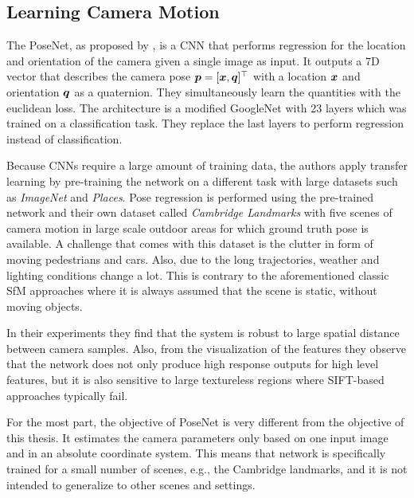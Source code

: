 		\subsection{Learning Camera Motion}
	
			The PoseNet, as proposed by \cite{kendall2015posenet}, is a CNN that performs regression for the location and orientation of the camera given a single image as input.
			It outputs a 7D vector that describes the camera pose $\bm{p} = [\bm{x}, \bm{q}]^\top$ with a location $\bm{x}$ and orientation $\bm{q}$ as a quaternion.
			They simultaneously learn the quantities with the euclidean loss.
			The architecture is a modified GoogleNet with 23 layers which was trained on a classification task.
			They replace the last layers to perform regression instead of classification.
			
			Because CNNs require a large amount of training data, the authors apply transfer learning by pre-training the network on a different task with large datasets such as \emph{ImageNet} and \emph{Places}.
			Pose regression is performed using the pre-trained network and their own dataset called \emph{Cambridge Landmarks} with five scenes of camera motion in large scale outdoor areas for which ground truth pose is available.
			A challenge that comes with this dataset is the clutter in form of moving pedestrians and cars.
			Also, due to the long trajectories, weather and lighting conditions change a lot.
			This is contrary to the aforementioned classic SfM approaches where it is always assumed that the scene is static, without moving objects.
			
			In their experiments they find that the system is robust to large spatial distance between camera samples.
			Also, from the visualization of the features they observe that the network does not only produce high response outputs for high level features, but it is also sensitive to large textureless regions where {SIFT}-based approaches typically fail.
			
			For the most part, the objective of PoseNet is very different from the objective of this thesis.
			It estimates the camera parameters only based on one input image and in an absolute coordinate system.
			This means that network is specifically trained for a small number of scenes, e.g., the Cambridge landmarks, and it is not intended to generalize to other scenes and settings.
			
